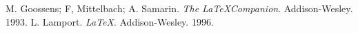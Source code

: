 \documentclass{article}
\begin{document}
\begin{thebibliography}{99}
	 M. Goossens; F, Mittelbach; A. Samarin.
	{\it The \LaTeX Companion}. Addison-Wesley. 1993.
	 L. Lamport. {\it \LaTeX}. Addison-Wesley. 1996.
\end{thebibliography}
\end{document}
